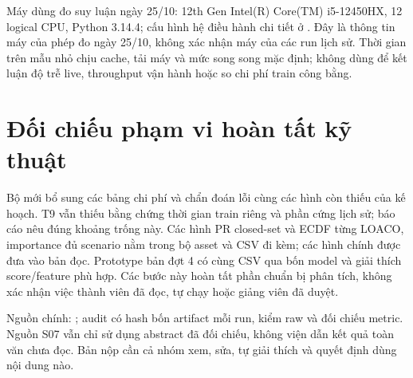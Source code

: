 Máy dùng đo suy luận ngày 25/10: 12th Gen Intel(R) Core(TM) i5-12450HX, 12 logical CPU, Python 3.14.4; cấu hình hệ điều hành chi tiết ở . Đây là thông tin máy của phép đo ngày 25/10, không xác nhận máy của các run lịch sử. Thời gian trên mẫu nhỏ chịu cache, tải máy và mức song song mặc định; không dùng để kết luận độ trễ live, throughput vận hành hoặc so chi phí train công bằng.

\section{Đối chiếu phạm vi hoàn tất kỹ thuật}
Bộ mới bổ sung các bảng chi phí và chẩn đoán lỗi cùng các hình còn thiếu của kế hoạch. T9 vẫn thiếu bằng chứng thời gian train riêng và phần cứng lịch sử; báo cáo nêu đúng khoảng trống này. Các hình PR closed-set và ECDF từng LOACO, importance đủ scenario nằm trong bộ asset và CSV đi kèm; các hình chính được đưa vào bản đọc. Prototype bản đợt 4 có cùng CSV qua bốn model và giải thích score/feature phù hợp. Các bước này hoàn tất phần chuẩn bị phân tích, không xác nhận việc thành viên đã đọc, tự chạy hoặc giảng viên đã duyệt.

Nguồn chính: ; audit có hash bốn artifact mỗi run, kiểm raw và đối chiếu metric. Nguồn S07 vẫn chỉ sử dụng abstract đã đối chiếu, không viện dẫn kết quả toàn văn chưa đọc. Bản nộp cần cả nhóm xem, sửa, tự giải thích và quyết định dùng nội dung nào.
